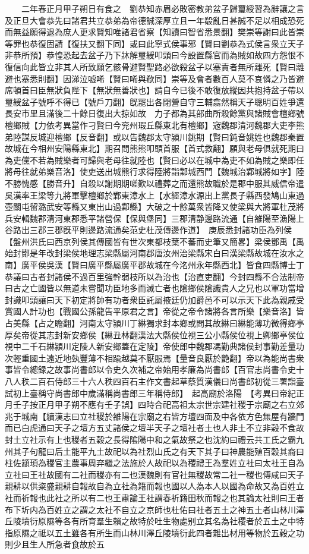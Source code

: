 　　二年春正月甲子朔日有食之　劉恭知赤眉必敗密教弟盆子歸璽綬習為辭讓之言及正旦大會恭先曰諸君共立恭弟為帝德誠深厚立且一年殽亂日甚誠不足以相成恐死而無益願得退為庶人更求賢知唯諸君省察【知讀曰智省悉景翻】樊崇等謝曰此皆崇等罪也恭復固請【復扶又翻下同】或曰此寧式侯事邪【賢曰劉恭為式侯言衆立天子非恭所預】恭惶恐起去盆子乃下牀解璽綬叩頭曰今設置縣官而為賊如故四方怨恨不復信向此皆立非其人所致願乞骸骨避賢聖路必欲殺盆子以塞責者無所離死【賢曰離避也塞悉則翻】因涕泣嘘唏【賢曰唏與欷同】崇等及會者數百人莫不哀憐之乃皆避席頓首曰臣無狀負陛下【無狀無善狀也】請自今已後不敢復放縱因共抱持盆子帶以璽綬盆子號呼不得已【號戶刀翻】旣罷出各閉營自守三輔翕然稱天子聰明百姓爭還長安市里且滿後二十餘日復出大掠如故　力子都為其部曲所殺餘黨與諸賊會檀鄉號檀鄉賊【力依考異當作刁賢曰今兖州瑕丘縣東北有檀鄉】宼魏郡清河魏郡大吏李熊弟陸謀反城迎檀鄉【反音翻】或以告魏郡太守潁川銚期【賢曰鈍音姚姓也魏郡秦置故城在今相州安陽縣東北】期召問熊熊叩頭首服【首式救翻】願與老母俱就死期曰為吏儻不若為賊樂者可歸與老母往就陸也【賢曰必以在城中為吏不如為賊之樂即任將母往就弟樂音洛】使吏送出城熊行求得陸將詣鄴城西門【魏城治鄴城將如字】陸不勝愧感【勝音升】自殺以謝期期嗟歎以禮葬之而還熊故職於是郡中服其威信帝遣吳漢率王梁等九將軍擊檀鄉於鄴東漳水上【水經漳水源出上黨長子縣西發鳩山東過壺關屯留潞武安等縣又東出山過鄴縣】大破之十餘萬衆皆降又使梁與大將軍杜茂將兵安輯魏郡清河東郡悉平諸營保【保與堡同】三郡清静邊路流通【自雒陽至漁陽上谷路出三郡三郡旣平則邊路流通矣范史杜茂傳邊作道】　庚辰悉封諸功臣為列侯【盤州洪氏曰西京列侯其傳國皆有世次東都枝葉不蕃而史筆又簡畧】梁侯鄧禹【禹始封鄼是年改封梁侯地理志梁縣屬河南郡唐汝州治梁縣宋白曰漢梁縣故城在汝水之南】廣平侯吳漢【賢曰廣平縣屬廣平郡故城在今洺州永年縣西北】皆食四縣博士丁恭議曰古者封諸侯不過百里強幹弱枝所以為治也【治直吏翻】今封四縣不合法制帝曰古之亡國皆以無道未嘗聞功臣地多而滅亡者也隂鄉侯隂識貴人之兄也以軍功當增封識叩頭讓曰天下初定將帥有功者衆臣託屬掖廷仍加爵邑不可以示天下此為親戚受賞國人計功也【戰國公孫龍告平原君之言】帝從之帝令諸將各言所樂【樂音洛】皆占美縣【占之瞻翻】河南太守潁川丁綝獨求封本鄉或問其故綝曰綝能薄功微得鄉亭厚矣帝從其志封新安鄉侯【綝丑林翻漢法大縣侯位視三公小縣侯位視上卿鄉亭侯位視中二千石綝潁川定陵人新安鄉蓋在定陵】帝使郎中魏郡馮勤典諸侯封事勤差量功次輕重國土遠近地埶豐薄不相踰越莫不厭服焉【量音良厭於艷翻】帝以為能尚書衆事皆令總録之故事尚書郎以令史久次補之帝始用孝廉為尚書郎【百官志尚書令史十八人秩二百石侍郎三十六人秩四百石主作文書起草蔡質漢儀曰尚書郎初從三署詣臺試初上臺稱守尚書郎中歲滿稱尚書郎三年稱侍郎】　起高廟於洛陽　【考異曰帝紀正月壬子按正月甲子朔不應有壬子誤】四時合祀高祖太宗世宗建社稷于宗廟之右立郊兆于城南【續漢志曰立社稷於雒陽在宗廟之右皆方壇四面及中各依方色無屋有牆門而已白虎通曰天子之壇方五丈諸侯之壇半天子之壇社者土也人非土不立非穀不食故封土立社示有上也稷者五穀之長得隂陽中和之氣故祭之也沈約曰禮云共工氏之霸九州其子句龍曰后土能平九土故祀以為社烈山氏之有天下其子曰神農能殖百穀其裔曰柱佐顓頊為稷官主農事周弃繼之法施於人故祀以為稷禮王為羣姓立社曰太社王自為立社曰王社故國有二社而稷亦有二也漢魏則有官社無稷故常二社一稷也傅咸曰天子親耕以供粢盛親耕自報故自為立社為籍而報也國以人為本人以國為命故又為百姓立社而祈報也此社之所以有二也王肅論王社謂春祈籍田秋而報之也其論太社則曰王者布下圻内為百姓立之謂之太社不自立之京師也杜佑曰社者五土之神五土者山林川澤丘陵墳衍原隰等各有所育羣生賴之故特於吐生物處别立其名為社稷者於五土之中特指原隰之祗以五土雖各有所生而山林川澤丘陵墳衍此四者雜出材用等物於五穀之功則少且生人所急者食故於五
